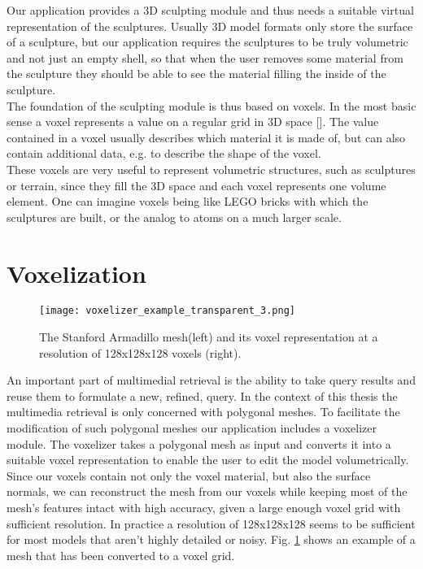 Our application provides a 3D sculpting module and thus needs a suitable virtual representation of the sculptures. Usually 3D model formats only store the surface of a sculpture, but our application requires the sculptures to be
truly volumetric and not just an empty shell, so that when the user removes some material from the sculpture they should be able to see the material filling the inside of the sculpture.\\
The foundation of the sculpting module is thus based on voxels. In the most basic sense a voxel represents a value on a regular grid in 3D space [].
The value contained in a voxel usually describes which material it is made of, but can also contain additional data, e.g. to describe the shape of the voxel.\\
These voxels are very useful to represent volumetric structures, such as sculptures or terrain, since they fill the 3D space and each voxel represents one volume element. One can imagine voxels being like LEGO bricks with which
the sculptures are built, or the analog to atoms on a much larger scale.

\section{Voxelization}

\hfill

\begin{figure}
\centering
\captionsetup{width=0.8\textwidth}
\texttt{[image: voxelizer\_example\_transparent\_3.png]}
\caption{The Stanford Armadillo mesh\protect\footnotemark  (left) and its voxel representation at a resolution of 128x128x128 voxels (right).}
\label{fig:voxelizer_example}
\end{figure}

An important part of multimedial retrieval is the ability to take query results and reuse them to formulate a new, refined, query. In the context of this thesis the multimedia retrieval
is only concerned with polygonal meshes. To facilitate the modification of such polygonal meshes our application includes a voxelizer module. The voxelizer takes a polygonal
mesh as input and converts it into a suitable voxel representation to enable the user to edit the model volumetrically. Since
our voxels contain not only the voxel material, but also the surface normals, we can reconstruct the mesh from our voxels while keeping most of the mesh's features intact with high accuracy, given
a large enough voxel grid with sufficient resolution. In practice a resolution of 128x128x128 seems to be sufficient for most models that aren't highly detailed or noisy.
Fig. \ref{fig:voxelizer_example} shows an example of a mesh that has been converted to a voxel grid.

